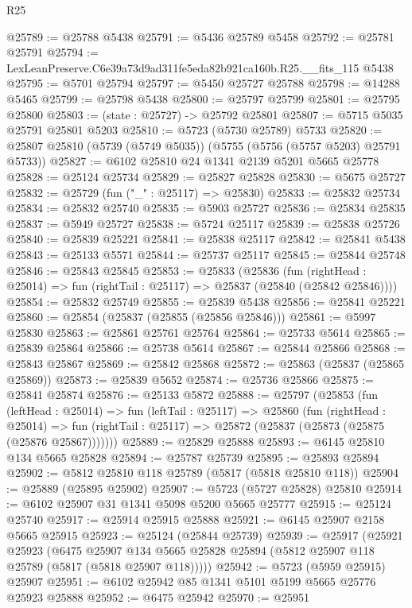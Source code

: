 \begin{lexlean}{R25}
\begin{coremodule}
@25789 := @25788 @5438
@25791 := @5436 @25789 @5458
@25792 := @25781 @25791
@25794 := LexLeanPreserve.C6e39a73d9ad311fe5eda82b921ca160b.R25.__fits_115 @5438
@25795 := @5701 @25794
@25797 := @5450 @25727 @25788
@25798 := @14288 @5465
@25799 := @25798 @5438
@25800 := @25797 @25799
@25801 := @25795 @25800
@25803 := (state : @25727) -> @25792 @25801
@25807 := @5715 @5035 @25791 @25801 @5203
@25810 := @5723 (@5730 @25789) @5733
@25820 := @25807 @25810 (@5739 (@5749 @5035)) (@5755 (@5756 (@5757 @5203) @25791 @5733))
@25827 := @6102 @25810 @24 @1341 @2139 @5201 @5665 @25778
@25828 := @25124 @25734
@25829 := @25827 @25828
@25830 := @5675 @25727
@25832 := @25729 (fun ("_" : @25117) => @25830)
@25833 := @25832 @25734
@25834 := @25832 @25740
@25835 := @5903 @25727
@25836 := @25834 @25835
@25837 := @5949 @25727
@25838 := @5724 @25117
@25839 := @25838 @25726
@25840 := @25839 @25221
@25841 := @25838 @25117
@25842 := @25841 @5438
@25843 := @25133 @5571
@25844 := @25737 @25117
@25845 := @25844 @25748
@25846 := @25843 @25845
@25853 := @25833
    (@25836
      (fun (rightHead : @25014) => fun (rightTail : @25117) => @25837 (@25840 (@25842 @25846))))
@25854 := @25832 @25749
@25855 := @25839 @5438
@25856 := @25841 @25221
@25860 := @25854 (@25837 (@25855 (@25856 @25846)))
@25861 := @5997 @25830
@25863 := @25861 @25761 @25764
@25864 := @25733 @5614
@25865 := @25839 @25864
@25866 := @25738 @5614
@25867 := @25844 @25866
@25868 := @25843 @25867
@25869 := @25842 @25868
@25872 := @25863 (@25837 (@25865 @25869))
@25873 := @25839 @5652
@25874 := @25736 @25866
@25875 := @25841 @25874
@25876 := @25133 @5872
@25888 := @25797
    (@25853
      (fun (leftHead : @25014) =>
      fun (leftTail : @25117) =>
      @25860
        (fun (rightHead : @25014) =>
        fun (rightTail : @25117) => @25872 (@25837 (@25873 (@25875 (@25876 @25867)))))))
@25889 := @25829 @25888
@25893 := @6145 @25810 @134 @5665 @25828
@25894 := @25787 @25739
@25895 := @25893 @25894
@25902 := @5812 @25810 @118 @25789 (@5817 (@5818 @25810 @118))
@25904 := @25889 (@25895 @25902)
@25907 := @5723 (@5727 @25828) @25810
@25914 := @6102 @25907 @31 @1341 @5098 @5200 @5665 @25777
@25915 := @25124 @25740
@25917 := @25914 @25915 @25888
@25921 := @6145 @25907 @2158 @5665 @25915
@25923 := @25124 (@25844 @25739)
@25939 := @25917
    (@25921
      @25923
      (@6475
        @25907
        @134
        @5665
        @25828
        @25894
        (@5812 @25907 @118 @25789 (@5817 (@5818 @25907 @118)))))
@25942 := @5723 (@5959 @25915) @25907
@25951 := @6102 @25942 @85 @1341 @5101 @5199 @5665 @25776 @25923 @25888
@25952 := @6475 @25942
@25970 := @25951

\end{coremodule}
\end{lexlean}
